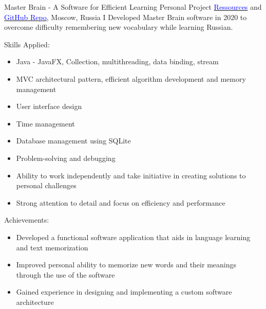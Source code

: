 \vspace{2mm}

    {Master Brain - A Software for Efficient Learning}
    {Personal Project}
    {\href{https://disk.yandex.ru/d/T0gdYBeMfautMg}{\textcolor{blue}{Ressources}} and 
    \href{https://github.com/DanGlChris/Master-Brain}{\textcolor{blue}{GitHub Repo}}, 
    Moscow, Russia
    }
    {
    \newline
    I Developed Master Brain software in 2020 to overcome difficulty remembering new vocabulary while learning Russian.    }
    {
    Skills Applied:
    \begin{itemize}
        \item Java - JavaFX,  Collection, multithreading, data binding, stream
        \item MVC architectural pattern, efficient algorithm development and memory management
        \item User interface design
        \item Time management
        \item Database management using SQLite
        \item Problem-solving and debugging
        \item Ability to work independently and take initiative in creating solutions to personal challenges
        \item Strong attention to detail and focus on efficiency and performance
    \end{itemize}
    Achievements:
    \begin{itemize}
        \item Developed a functional software application that aids in language learning and text memorization
        \item Improved personal ability to memorize new words and their meanings through the use of the software
        \item Gained experience in designing and implementing a custom software architecture
    \end{itemize}
    }

\vspace{2mm}


